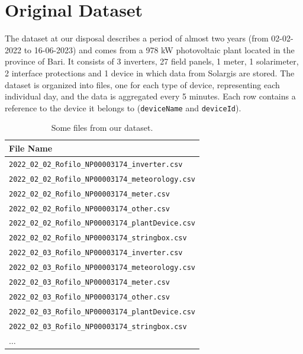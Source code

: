 \section{Original Dataset} \label{sec:dataset}
The dataset at our disposal describes a period of almost two years
(from 02-02-2022 to 16-06-2023) and comes from a 978 kW photovoltaic
plant located in the province of Bari. It consists of 3 inverters,
27 field panels, 1 meter, 1 solarimeter, 2 interface protections
and 1  device in which data from Solargis are stored.
The dataset is organized into files, one for each type of device,
representing each individual day, and the data is aggregated
every 5 minutes. Each row contains a reference to the device
it belongs to (\verb|deviceName| and \verb|deviceId|).



\begin{table}[H]
	\begin{center}
		\begin{tabular}[c]{l}
			\textbf{File Name}                                  \\
			\hline
			\verb|2022_02_02_Rofilo_NP00003174_inverter.csv|    \\
			\verb|2022_02_02_Rofilo_NP00003174_meteorology.csv| \\
			\verb|2022_02_02_Rofilo_NP00003174_meter.csv|       \\
			\verb|2022_02_02_Rofilo_NP00003174_other.csv|       \\
			\verb|2022_02_02_Rofilo_NP00003174_plantDevice.csv| \\
			\verb|2022_02_02_Rofilo_NP00003174_stringbox.csv|   \\
			\verb|2022_02_03_Rofilo_NP00003174_inverter.csv|    \\
			\verb|2022_02_03_Rofilo_NP00003174_meteorology.csv| \\
			\verb|2022_02_03_Rofilo_NP00003174_meter.csv|       \\
			\verb|2022_02_03_Rofilo_NP00003174_other.csv|       \\
			\verb|2022_02_03_Rofilo_NP00003174_plantDevice.csv| \\
			\verb|2022_02_03_Rofilo_NP00003174_stringbox.csv|   \\
			$\ldots$                                            \\
		\end{tabular}
	\end{center}
	\caption{Some files from our dataset.}\label{tab:datasunto}
\end{table}

